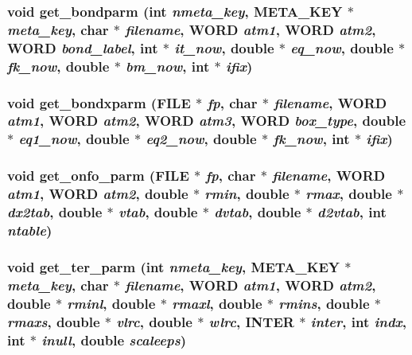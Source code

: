\subsubsection{\setlength{\rightskip}{0pt plus 5cm}void get\_\-bondparm (int {\em nmeta\_\-key}, {\bf META\_\-KEY} $\ast$ {\em meta\_\-key}, char $\ast$ {\em filename}, {\bf WORD} {\em atm1}, {\bf WORD} {\em atm2}, {\bf WORD} {\em bond\_\-label}, int $\ast$ {\em it\_\-now}, double $\ast$ {\em eq\_\-now}, double $\ast$ {\em fk\_\-now}, double $\ast$ {\em bm\_\-now}, int $\ast$ {\em ifix})}\label{input_2md__getparm_8c_3aaea509eabbc9ec7f60b6fd6e7a1c0c}


\subsubsection{\setlength{\rightskip}{0pt plus 5cm}void get\_\-bondxparm (FILE $\ast$ {\em fp}, char $\ast$ {\em filename}, {\bf WORD} {\em atm1}, {\bf WORD} {\em atm2}, {\bf WORD} {\em atm3}, {\bf WORD} {\em box\_\-type}, double $\ast$ {\em eq1\_\-now}, double $\ast$ {\em eq2\_\-now}, double $\ast$ {\em fk\_\-now}, int $\ast$ {\em ifix})}\label{input_2md__getparm_8c_3b6220a5e830a4771e1424f94441f66e}


\subsubsection{\setlength{\rightskip}{0pt plus 5cm}void get\_\-onfo\_\-parm (FILE $\ast$ {\em fp}, char $\ast$ {\em filename}, {\bf WORD} {\em atm1}, {\bf WORD} {\em atm2}, double $\ast$ {\em rmin}, double $\ast$ {\em rmax}, double $\ast$ {\em dx2tab}, double $\ast$ {\em vtab}, double $\ast$ {\em dvtab}, double $\ast$ {\em d2vtab}, int {\em ntable})}\label{input_2md__getparm_8c_5a05c8e90ce64ecb7134feba37375279}


\subsubsection{\setlength{\rightskip}{0pt plus 5cm}void get\_\-ter\_\-parm (int {\em nmeta\_\-key}, {\bf META\_\-KEY} $\ast$ {\em meta\_\-key}, char $\ast$ {\em filename}, {\bf WORD} {\em atm1}, {\bf WORD} {\em atm2}, double $\ast$ {\em rminl}, double $\ast$ {\em rmaxl}, double $\ast$ {\em rmins}, double $\ast$ {\em rmaxs}, double $\ast$ {\em vlrc}, double $\ast$ {\em wlrc}, {\bf INTER} $\ast$ {\em inter}, int {\em indx}, int $\ast$ {\em inull}, double {\em scaleeps})}\label{input_2md__getparm_8c_5a3c1f0454ea5320a9677b3261bb2bfa}



